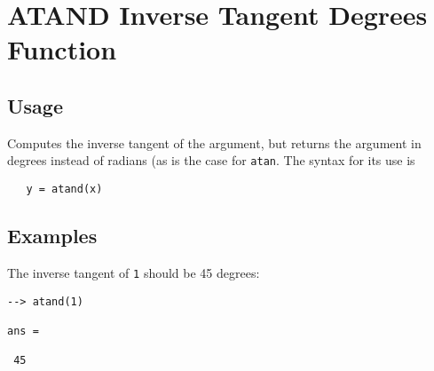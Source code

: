 \section{ATAND Inverse Tangent Degrees Function}

\subsection{Usage}

Computes the inverse tangent of the argument, but returns
the argument in degrees instead of radians (as is the case
for \verb|atan|. The syntax for its use is
\begin{verbatim}
   y = atand(x)
\end{verbatim}
\subsection{Examples}

The inverse tangent of \verb|1| should be 45 degrees:
\begin{verbatim}
--> atand(1)

ans = 

 45 
\end{verbatim}

